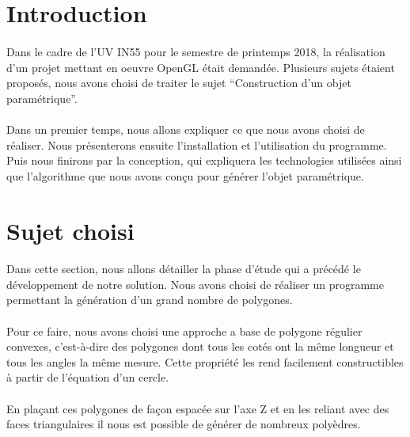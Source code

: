 \documentclass[article, backcover, french, nodocumentinfo]{upmethodology-document}
\begin{document}
	\thispagestyle{empty}
	\upmdocumentsummary{}
	\upmdocumentauthors{}
	\upmdocumentinformedpeople{}
	\upmpublicationpage{}
	\newpage{}
	\tableofcontents{}
	\newpage{}
	\section{Introduction}
		\paragraph*{}
			Dans le cadre de l'UV IN55 pour le semestre de printemps 2018, la réalisation d'un projet mettant en oeuvre OpenGL était demandée.
			Plusieurs sujets étaient proposés, nous avons choisi de traiter le sujet ``Construction d'un objet paramétrique''.
		\paragraph*{}
			Dans un premier temps, nous allons expliquer ce que nous avons choisi de réaliser.
			Nous présenterons ensuite l'installation et l'utilisation du programme.
			Puis nous finirons par la conception, qui expliquera les technologies utilisées ainsi que l'algorithme que nous avons conçu pour générer l'objet paramétrique.

	\section{Sujet choisi}
		\paragraph*{}
			Dans cette section, nous allons détailler la phase d'étude qui a précédé le développement de notre solution.
			Nous avons choisi de réaliser un programme permettant la génération d'un grand nombre de polygones.
		\paragraph*{}
			Pour ce faire, nous avons choisi une approche a base de polygone régulier convexes, c'est-à-dire des polygones dont tous les cotés ont la même longueur et tous les angles la même mesure. Cette propriété les rend facilement constructibles à partir de l'équation d'un cercle.
		\paragraph*{}
			En plaçant ces polygones de façon espacée sur l'axe Z et en les reliant avec des faces triangulaires il nous est possible de générer de nombreux polyèdres.
\end{document}
